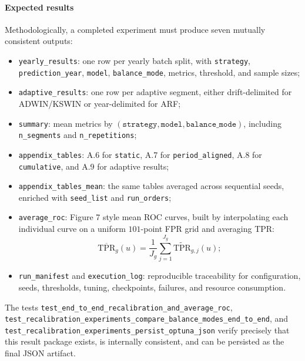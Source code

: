 \paragraph{Expected results}
Methodologically, a completed experiment must produce seven mutually consistent outputs:
\begin{itemize}[leftmargin=*]
  \item \texttt{yearly\_results}: one row per yearly batch split, with \texttt{strategy}, \texttt{prediction\_year}, \texttt{model}, \texttt{balance\_mode}, metrics, threshold, and sample sizes;
  \item \texttt{adaptive\_results}: one row per adaptive segment, either drift-delimited for ADWIN/KSWIN or year-delimited for ARF;
  \item \texttt{summary}: mean metrics by \((\texttt{strategy}, \texttt{model}, \texttt{balance\_mode})\), including \texttt{n\_segments} and \texttt{n\_repetitions};
  \item \texttt{appendix\_tables}: A.6 for \texttt{static}, A.7 for \texttt{period\_aligned}, A.8 for \texttt{cumulative}, and A.9 for adaptive results;
  \item \texttt{appendix\_tables\_mean}: the same tables averaged across sequential seeds, enriched with \texttt{seed\_list} and \texttt{run\_orders};
  \item \texttt{average\_roc}: Figure 7 style mean ROC curves, built by interpolating each individual curve on a uniform \(101\)-point FPR grid and averaging TPR:
  \[
  \overline{\mathrm{TPR}}_g(u) = \frac{1}{J_g}\sum_{j=1}^{J_g}\widetilde{\mathrm{TPR}}_{g,j}(u);
  \]
  \item \texttt{run\_manifest} and \texttt{execution\_log}: reproducible traceability for configuration, seeds, thresholds, tuning, checkpoints, failures, and resource consumption.
\end{itemize}
The tests \texttt{test\_end\_to\_end\_recalibration\_and\_average\_roc}, \texttt{test\_recalibration\_experiments\_compare\_balance\_modes\_end\_to\_end}, and \texttt{test\_recalibration\_experiments\_persist\_optuna\_json} verify precisely that this result package exists, is internally consistent, and can be persisted as the final JSON artifact.

